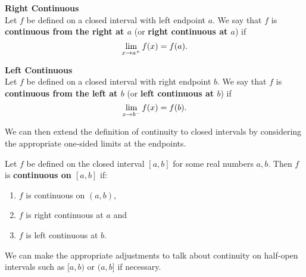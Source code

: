 \begin{definition}\label{def:left_right_cont}%
\textbf{Right Continuous}\\
Let $f$ be defined on a closed interval with left endpoint $a$. We say that $f$ is \textbf{continuous from the right at $a$} (or \textbf{right continuous at $a$}) if
 \[\lim_{x\to a^+} f(x)=f(a).\vspace{-\baselineskip}\]

\textbf{Left Continuous}\\
Let $f$ be defined on a closed interval with right endpoint $b$. We say that $f$ is \textbf{continuous from the left at $b$} (or \textbf{left continuous at $b$}) if
\[\lim_{x\to b^-} f(x)=f(b).\vspace{-\baselineskip}\]
\end{definition}

We can then extend the definition of continuity to closed intervals by considering the appropriate one-sided limits at the endpoints.

\begin{definition}\label{def:closed_continuity}%
Let $f$ be defined on the closed interval $[a,b]$ for some real numbers $a,b$. Then $f$ is \textbf{continuous on $[a,b]$} if:
\begin{enumerate}
	\item	$f$ is continuous on $(a,b)$,
	\item	$f$ is right continuous at $a$ and 
	\item	$f$ is left continuous at $b$.
\end{enumerate}
\end{definition}
		
We can make the appropriate adjustments to talk about continuity on half-open intervals such as $[a,b)$ or $(a,b]$ if necessary.\bigskip
%
%


